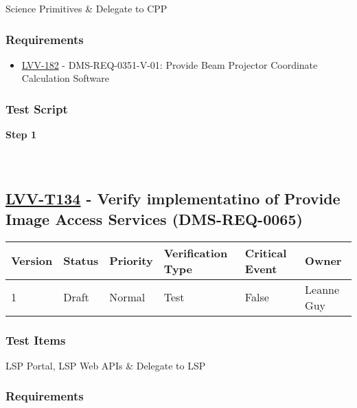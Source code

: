 Science Primitives \& Delegate to CPP

\hypertarget{requirements-110}{%
\subsubsection{Requirements}\label{requirements-110}}

\begin{itemize}
\tightlist
\item
  \href{https://jira.lsstcorp.org/browse/LVV-182}{LVV-182} -
  DMS-REQ-0351-V-01: Provide Beam Projector Coordinate Calculation
  Software
\end{itemize}

\hypertarget{test-script-110}{%
\subsubsection{Test Script}\label{test-script-110}}

\textbf{Step 1}\\
~\\
~\\

\hypertarget{lvv-t134---verify-implementatino-of-provide-image-access-services-dms-req-0065}{%
\subsection{\texorpdfstring{\href{https://jira.lsstcorp.org/secure/Tests.jspa\#/testCase/LVV-T134}{LVV-T134}
- Verify implementatino of Provide Image Access Services
(DMS-REQ-0065)}{LVV-T134 - Verify implementatino of Provide Image Access Services (DMS-REQ-0065)}}\label{lvv-t134---verify-implementatino-of-provide-image-access-services-dms-req-0065}}

\begin{longtable}[]{@{}llllll@{}}
\toprule
Version & Status & Priority & Verification Type & Critical Event &
Owner\tabularnewline
\midrule
\endhead
1 & Draft & Normal & Test & False & Leanne Guy\tabularnewline
\bottomrule
\end{longtable}

\hypertarget{test-items-110}{%
\subsubsection{Test Items}\label{test-items-110}}

LSP Portal, LSP Web APIs \& Delegate to LSP

\hypertarget{requirements-111}{%
\subsubsection{Requirements}\label{requirements-111}}

